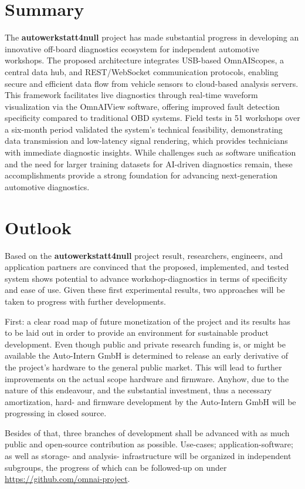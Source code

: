 \documentclass[conference,a4paper]{IEEEtran}
\begin{document}
\section{Summary}
The \textbf{autowerkstatt4null} project has made substantial progress in developing an innovative off-board diagnostics ecosystem for independent automotive workshops. 
The proposed architecture integrates USB-based OmnAIScopes, a central data hub, and REST/WebSocket communication protocols, 
enabling secure and efficient data flow from vehicle sensors to cloud-based analysis servers. 
This framework facilitates live diagnostics through real-time waveform visualization via the OmnAIView software, 
offering improved fault detection specificity compared to traditional OBD systems. 
Field tests in 51 workshops over a six-month period validated the system's technical feasibility, 
demonstrating data transmission and low-latency signal rendering, which provides technicians with immediate diagnostic insights. 
While challenges such as software unification and the need for larger training datasets for AI-driven diagnostics remain, 
these accomplishments provide a strong foundation for advancing next-generation automotive diagnostics.

\section{Outlook}
Based on the \textbf{autowerkstatt4null} project result, researchers, engineers, and application partners are convinced that the proposed, 
implemented, and tested system shows potential to advance workshop-diagnostics in terms of specificity and ease of use.
Given these first experimental results, two approaches will be taken to progress with further developments. 

First: a clear road map of future monetization of the project and its results has to be laid out in order to provide an environment for sustainable product development. 
Even though public and private research funding is, or might be available the Auto-Intern GmbH is determined to release an early derivative of the project's hardware to the general public market. 
This will lead to further improvements on the actual scope hardware and firmware. 
Anyhow, due to the nature of this endeavour, and the substantial investment, thus a necessary amortization, hard- and firmware development by the Auto-Intern GmbH will be progressing in closed source. 

Besides of that, three branches of development shall be advanced with as much public and open-source contribution as possible. 
Use-cases; application-software; as well as storage- and analysis- infrastructure will be organized in independent subgroups, 
the progress of which can be followed-up on under \url{https://github.com/omnai-project}.
\end{document}
